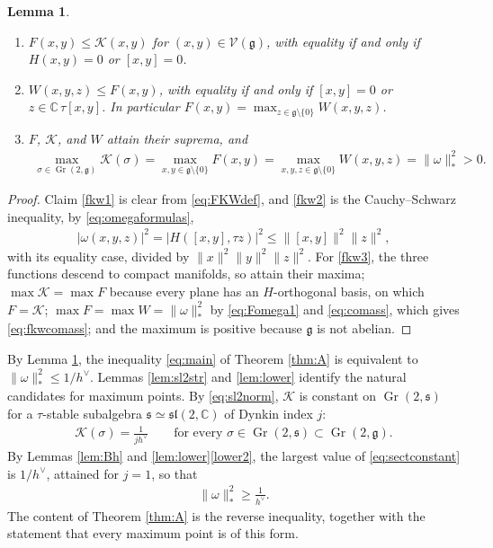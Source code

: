 \documentclass [leqno, 10pt]{amsart}
\newtheorem{lemma}[theorem]{Lemma}%
\theoremstyle{definition}
\numberwithin{equation}{section}
\newcommand{\grass}{\operatorname{Gr}}
\newcommand{\sect}{\mathscr{K}}
\newcommand{\om}{\omega}
\newcommand{\sll}{\mathfrak{sl}}
\newcommand{\g}{\mathfrak{g}}
\newcommand{\stiefel}{\mathscr{V}}
\newcommand{\com}{\mathbb C}
\newcommand{\hv}{h^\vee}
\newcommand{\norm}[1]{\lVert #1\rVert}
\newcommand{\comass}[1]{\lVert #1\rVert_{\ast}}%
\newcommand{\subs}{\mathfrak{s}}
\begin{document}
\begin{lemma}\label{fkwmaxlemma}
\leavevmode\noindent
\begin{enumerate}[label=(\arabic*), ref=(\arabic*)]
\item\label{fkw1} $F(x, y) \leq \sect(x, y)$ for $(x, y) \in \stiefel(\g)$, with equality if and only if $H(x, y) = 0$ or $[x, y] = 0$.
\item\label{fkw2} $W(x, y, z) \leq F(x, y)$, with equality if and only if $[x, y] = 0$ or $z \in \com\,\tau[x, y]$. In particular $F(x,y)=\max_{z \in \g \setminus \{0\}}W(x,y,z)$.
\item\label{fkw3} $F$, $\sect$, and $W$ attain their suprema, and
\begin{align}\label{eq:fkwcomass}
\max_{\sigma \in \grass(2, \g)} \sect(\sigma) = \max_{x, y \in \g \setminus \{0\}} F(x, y) = \max_{x, y, z \in \g \setminus \{0\}} W(x, y, z) =\comass{\om}^2 > 0.
\end{align}
\end{enumerate}
\end{lemma}

\begin{proof}
Claim \ref{fkw1} is clear from \eqref{eq:FKWdef}, and \ref{fkw2} is the Cauchy--Schwarz inequality, by \eqref{eq:omegaformulas},
\begin{align}\label{eq:Fomega1}
|\omega(x,y,z)|^{2} = |H([x, y], \tau z)|^{2} \leq \norm{[x, y]}^{2}\norm{z}^{2},
\end{align}
with its equality case, divided by $\norm{x}^{2}\norm{y}^{2}\norm{z}^{2}$. For \ref{fkw3}, the three functions descend to compact manifolds, so attain their maxima; $\max\sect = \max F$ because every plane has an $H$-orthogonal basis, on which $F = \sect$; $\max F = \max W = \comass{\om}^{2}$ by \eqref{eq:Fomega1} and \eqref{eq:comass}, which gives \eqref{eq:fkwcomass}; and the maximum is positive because $\g$ is not abelian.
\end{proof}

By Lemma \ref{fkwmaxlemma}, the inequality \eqref{eq:main} of Theorem \ref{thm:A} is equivalent to $\comass{\om}^{2} \leq 1/\hv$. Lemmas \ref{lem:sl2str} and \ref{lem:lower} identify the natural candidates for maximum points. By \eqref{eq:sl2norm}, $\sect$ is constant on $\grass(2, \subs)$ for a $\tau$-stable subalgebra $\subs \simeq \sll(2, \com)$ of Dynkin index $j$:
\begin{align}\label{eq:sectconstant}
\sect(\sigma) = \frac{1}{j\hv} \qquad \text{for every } \sigma \in \grass(2, \subs) \subset \grass(2, \g).
\end{align}
By Lemmas \ref{lem:Bh} and \ref{lem:lower}\ref{lower2}, the largest value of \eqref{eq:sectconstant} is $1/\hv$, attained for $j = 1$, so that
\begin{align}\label{eq:lowerbound}
\comass{\om}^{2} \geq \frac{1}{\hv}.
\end{align}
The content of Theorem \ref{thm:A} is the reverse inequality, together with the statement that every maximum point is of this form.
\end{document}
